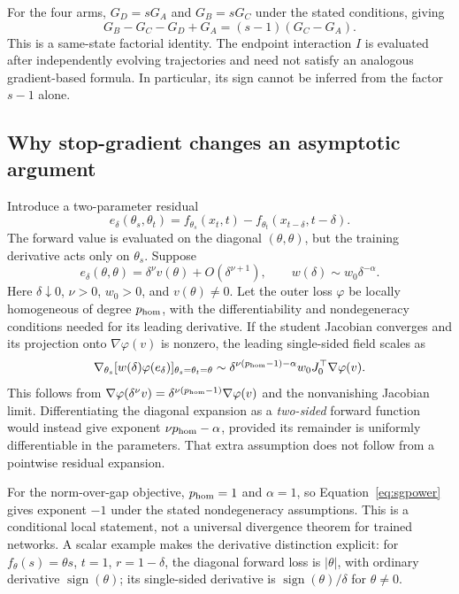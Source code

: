 For the four arms, $G_D=sG_A$ and $G_B=sG_C$ under the stated conditions, giving
\begin{equation}
 G_B-G_C-G_D+G_A=(s-1)(G_C-G_A).
\end{equation}
This is a same-state factorial identity. The endpoint interaction $I$ is evaluated after independently evolving trajectories and need not satisfy an analogous gradient-based formula. In particular, its sign cannot be inferred from the factor $s-1$ alone.

\subsection{Why stop-gradient changes an asymptotic argument}
Introduce a two-parameter residual
\begin{equation}
 e_\delta(\theta_s,\theta_t)=
 f_{\theta_s}(x_t,t)-f_{\theta_t}(x_{t-\delta},t-\delta).
\end{equation}
The forward value is evaluated on the diagonal $(\theta,\theta)$, but the training derivative acts only on $\theta_s$. Suppose
\begin{equation}
 e_\delta(\theta,\theta)=\delta^\nu v(\theta)+O(\delta^{\nu+1}),\qquad
 w(\delta)\sim w_0\delta^{-\alpha}.
\end{equation}
Here $\delta\downarrow0$, $\nu>0$, $w_0>0$, and $v(\theta)\neq0$. Let the outer loss $\varphi$ be locally homogeneous of degree $p_{\rm hom}$, with the differentiability and nondegeneracy conditions needed for its leading derivative. If the student Jacobian converges and its projection onto $\nabla\varphi(v)$ is nonzero, the leading single-sided field scales as
\begin{equation}
 \nabla_{\theta_s}[w(\delta)\varphi(e_\delta)]_{\theta_s=\theta_t=\theta}
 \sim\delta^{\nu(p_{\rm hom}-1)-\alpha}
 w_0J_0^\top\nabla\varphi(v).
 \label{eq:sgpower}
\end{equation}
This follows from $\nabla\varphi(\delta^\nu v)=\delta^{\nu(p_{\rm hom}-1)}\nabla\varphi(v)$ and the nonvanishing Jacobian limit. Differentiating the diagonal expansion as a \emph{two-sided} forward function would instead give exponent $\nu p_{\rm hom}-\alpha$, provided its remainder is uniformly differentiable in the parameters. That extra assumption does not follow from a pointwise residual expansion.

For the norm-over-gap objective, $p_{\rm hom}=1$ and $\alpha=1$, so Equation~\ref{eq:sgpower} gives exponent $-1$ under the stated nondegeneracy assumptions. This is a conditional local statement, not a universal divergence theorem for trained networks. A scalar example makes the derivative distinction explicit: for $f_\theta(s)=\theta s$, $t=1$, $r=1-\delta$, the diagonal forward loss is $|\theta|$, with ordinary derivative $\operatorname{sign}(\theta)$; its single-sided derivative is $\operatorname{sign}(\theta)/\delta$ for $\theta\neq0$.


